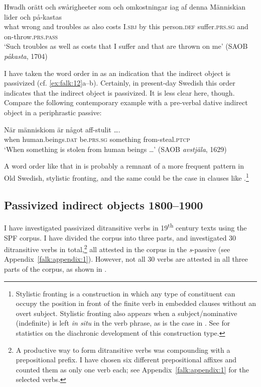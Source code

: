 \documentclass[output=paper]{langscibook}
\begin{document}
\ex\label{ex:falk:17d}
\gll Hwadh  orätt    och  swårigheeter  som  och  omkostningar  iag    af  denna Människian    lider          och  på-kastas\\
what    wrong  and  troubles       as     also  costs          I.\textsc{sbj}  by  this            person.\textsc{def}    suffer.\textsc{prs.sg}    and  on-throw.\textsc{prs}.\textsc{pass}\\
\glt ‘Such troubles as well as costs that I suffer and that are thrown on   me’ {(SAOB \textit{påkasta}, 1704)}
\z
\z

I have taken the word order in  as an indication that the indirect object is passivized (cf. \ref{ex:falk:12}a–b). Certainly, in present-day Swedish this order indicates that the indirect object is passivized. It is less clear here, though. Compare the following contemporary example with a pre-verbal dative indirect object in a periphrastic passive:

\ea%
    \label{ex:falk:18}
\gll När  människiom      är        något      aff-stulit …. \\
    when  human.beings\textsc{.dat}  be.\textsc{prs.sg}  something  from-steal.\textsc{ptcp}\\
\glt ‘When something is stolen from human beings …’ (SAOB \textit{avstjäla}, 1629)
\z


A word order like that in  is probably a remnant of a more frequent pattern in Old Swedish, stylistic fronting, and the same could be the case in clauses like .\footnote{Stylistic fronting is a construction in which any type of constituent can occupy the position in front of the finite verb in embedded clauses without an overt subject. Stylistic fronting also appears when a subject/nominative (indefinite) is left \textit{in situ} in the verb phrase, as is the case in . See \citet[326]{Falk1993} for statistics on the diachronic development of this construction type.}

\subsection{Passivized indirect objects 1800–1900}\label{sec:falk:3.5}


I have investigated passivized ditransitive verbs in 19\textsuperscript{th} century texts using the SPF corpus. I have divided the corpus into three parts, and investigated 30 ditransitive verbs in total,\footnote{A productive way to form ditransitive verbs was compounding with a prepositional prefix. I have chosen six different prepositional affixes and counted them as only one verb each; see Appendix~\ref{falk:appendix:1} for the selected verbs.} all attested in the corpus in the \textit{s}{}-passive (see Appendix~\ref{falk:appendix:1}). However, not all 30 verbs are attested in all three parts of the corpus, as shown in .
\end{document}
